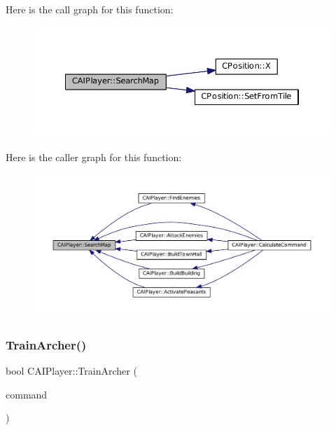 Here is the call graph for this function\+:
\nopagebreak
\begin{figure}[H]
\begin{center}
\leavevmode
\includegraphics[width=350pt]{classCAIPlayer_afafbe8fc589e09a16ae1f02f2794d7b0_cgraph}
\end{center}
\end{figure}
Here is the caller graph for this function\+:
\nopagebreak
\begin{figure}[H]
\begin{center}
\leavevmode
\includegraphics[width=350pt]{classCAIPlayer_afafbe8fc589e09a16ae1f02f2794d7b0_icgraph}
\end{center}
\end{figure}
\hypertarget{classCAIPlayer_af2edf1e3c54d6af693f768f86d484fd6}{}\label{classCAIPlayer_af2edf1e3c54d6af693f768f86d484fd6} 
\subsubsection{\texorpdfstring{Train\+Archer()}{TrainArcher()}}
{\footnotesize\ttfamily bool C\+A\+I\+Player\+::\+Train\+Archer (\begin{DoxyParamCaption}\item[{\hyperlink{structSPlayerCommandRequest}{S\+Player\+Command\+Request} \&}]{command }\end{DoxyParamCaption})\hspace{0.3cm}{\ttfamily [protected]}}



